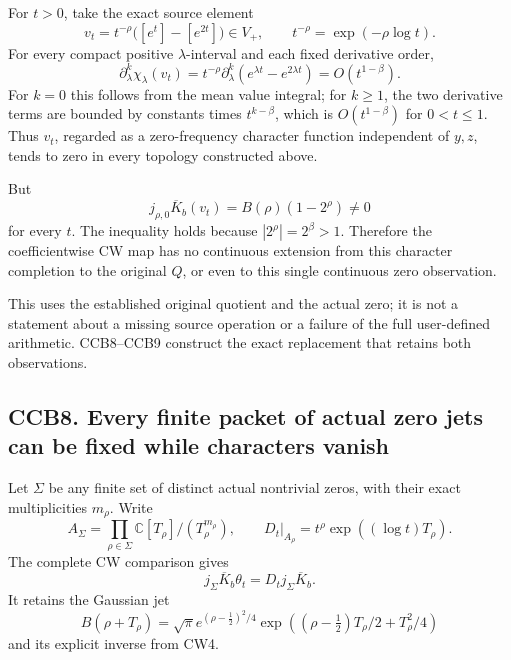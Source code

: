 For \(t>0\), take the exact source element \[
v_t=t^{-\rho}\bigl([e^t]-[e^{2t}]\bigr)\in V_+,
\qquad t^{-\rho}=\exp(-\rho\log t).
\tag{CCB7.2}
\] For every compact positive \(\lambda\)-interval and each fixed
derivative order, \[
\partial_\lambda^k\chi_\lambda(v_t)
=t^{-\rho}\partial_\lambda^k(e^{\lambda t}-e^{2\lambda t})
=O(t^{1-\beta}).
\tag{CCB7.3}
\] For \(k=0\) this follows from the mean value integral; for \(k\ge1\),
the two derivative terms are bounded by constants times \(t^{k-\beta}\),
which is \(O(t^{1-\beta})\) for \(0<t\le1\). Thus \(v_t\), regarded as a
zero-frequency character function independent of \(y,z\), tends to zero
in every topology constructed above.

But \[
j_{\rho,0}\overline K_b(v_t)
=B(\rho)(1-2^\rho)\ne0
\tag{CCB7.4}
\] for every \(t\). The inequality holds because \(|2^\rho|=2^\beta>1\).
Therefore the coefficientwise CW map has no continuous extension from
this character completion to the original \(Q\), or even to this single
continuous zero observation.

This uses the established original quotient and the actual zero; it is
not a statement about a missing source operation or a failure of the
full user-defined arithmetic. CCB8--CCB9 construct the exact replacement
that retains both observations.

\subsection{CCB8. Every finite packet of actual zero jets can be fixed
while characters
vanish}\label{ccb8.-every-finite-packet-of-actual-zero-jets-can-be-fixed-while-characters-vanish}

Let \(\Sigma\) be any finite set of distinct actual nontrivial zeros,
with their exact multiplicities \(m_\rho\). Write \[
A_\Sigma=\prod_{\rho\in\Sigma}
\mathbb C[T_\rho]/(T_\rho^{m_\rho}),
\qquad
D_t|_{A_\rho}=t^\rho\exp((\log t)T_\rho).
\tag{CCB8.1}
\] The complete CW comparison gives \[
j_\Sigma\overline K_b\theta_t=D_tj_\Sigma\overline K_b.
\] It retains the Gaussian jet \[
B(\rho+T_\rho)=
\sqrt\pi e^{(\rho-\frac12)^2/4}
\exp((\rho-\tfrac12)T_\rho/2+T_\rho^2/4)
\] and its explicit inverse from CW4.

